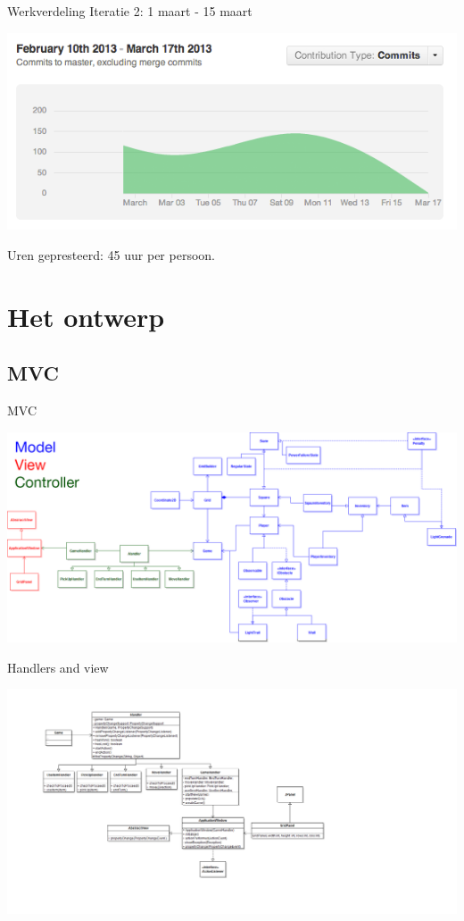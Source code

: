 \documentclass[t]{beamer}
\begin{document}
\begin{frame}{Werkverdeling}
Iteratie 2: 1 maart - 15 maart

\begin{center}
\includegraphics[width= 0.90\linewidth]{images/flowchart}
\end{center}

Uren gepresteerd: 45 uur per persoon.

\end{frame}
\section{Het ontwerp}
\subsection{MVC}

\begin{frame}{MVC}
\begin{center}
\includegraphics[width=0.9\linewidth]{images/MVC-overview3}
\end{center}
\end{frame}


\begin{frame}{Handlers and view}
\begin{center}
\includegraphics[width=\linewidth]{images/Handlers-View}
\end{center}
\end{frame}
\end{document}
